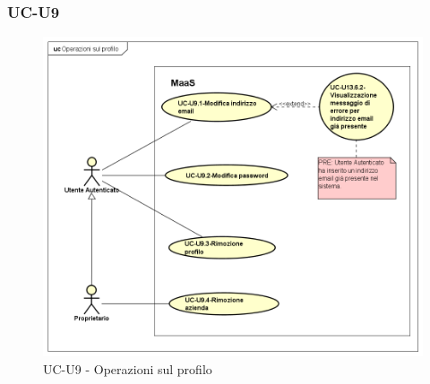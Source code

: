 \subsubsection{UC-U9}

    \begin{figure}[H]
      \begin{center}
        \includegraphics[width=12cm]{res/img/UCUtenti/UCUtenteA/UC-U9- Operazioni sul profilo/Operazioni sul profilo}
      \caption{UC-U9 - Operazioni sul profilo}
      \end{center} 
    \end{figure}    
    
